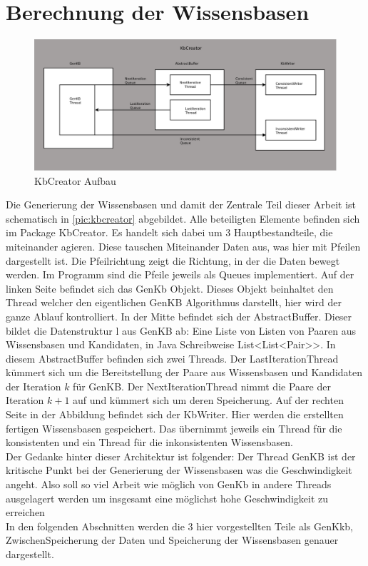 \documentclass[12pt,a4paper]{article}
\begin{document}
\section{Berechnung der Wissensbasen}
\label{sec:kbcreator} %



\begin{figure}
\includegraphics[width=1\linewidth]{bilder/kbcreator.png}
\caption{KbCreator Aufbau}
\label{pic:kbcreator}
\end{figure}



Die Generierung der Wissensbasen und damit der Zentrale Teil dieser Arbeit ist schematisch in \autoref{pic:kbcreator} abgebildet. Alle beteiligten Elemente befinden sich im Package KbCreator. Es handelt sich dabei um 3 Hauptbestandteile, die miteinander agieren. Diese tauschen Miteinander Daten aus, was hier mit Pfeilen dargestellt ist. Die Pfeilrichtung zeigt die Richtung, in der die Daten bewegt werden. Im Programm sind die Pfeile jeweils als Queues implementiert. Auf der linken  Seite befindet sich das GenKb Objekt. Dieses Objekt beinhaltet den Thread welcher den eigentlichen GenKB Algorithmus darstellt, hier wird der ganze Ablauf kontrolliert. In der Mitte befindet sich der AbstractBuffer. Dieser bildet die Datenstruktur \glqq l \glqq \space aus GenKB ab: Eine Liste von Listen von Paaren aus Wissensbasen und Kandidaten, in Java Schreibweise List<List<Pair>>. In diesem AbstractBuffer befinden sich zwei Threads. Der LastIterationThread kümmert sich um die Bereitstellung der Paare aus Wissensbasen und Kandidaten der Iteration $k$ für GenKB. Der NextIterationThread nimmt die Paare der Iteration $k+1$ auf und kümmert sich um deren Speicherung. Auf der rechten Seite in der Abbildung befindet sich der KbWriter. Hier werden die erstellten fertigen Wissensbasen gespeichert. Das übernimmt jeweils ein Thread für die konsistenten und ein Thread für die inkonsistenten Wissensbasen. \\
Der Gedanke hinter dieser Architektur ist folgender: Der Thread GenKB ist der kritische Punkt bei der Generierung der Wissensbasen was die Geschwindigkeit angeht. Also soll so viel Arbeit wie möglich von GenKb in andere Threads ausgelagert werden um insgesamt eine möglichst hohe Geschwindigkeit zu erreichen\\
In den folgenden Abschnitten werden die 3 hier vorgestellten Teile als GenKkb, ZwischenSpeicherung der Daten und Speicherung der Wissensbasen genauer dargestellt.
\end{document}
